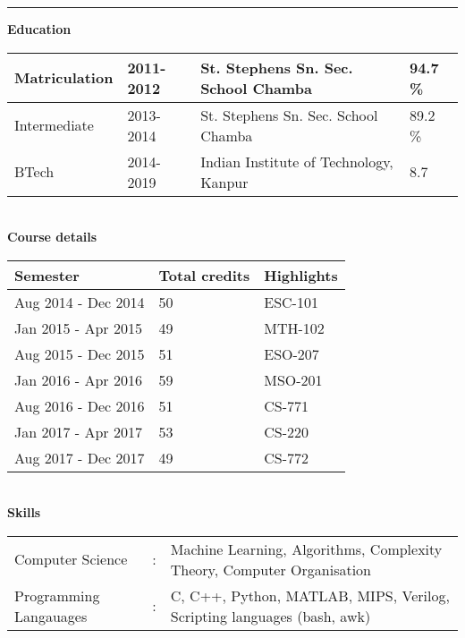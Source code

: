\documentclass[a4paper, 10pt]{article}
\begin{document}
\noindent\rule{\textwidth}{0.1pt}
\newline \newline
\hspace*{1.5ex}\textbf{Education}
\begin{table}[!h]
\renewcommand{\arraystretch}{1.2}
\begin{tabular}{|l|l|l|l|}
\hline
Matriculation & 2011-2012 & St. Stephens Sn. Sec. School Chamba  &  94.7 \% \\
\hline
Intermediate  & 2013-2014 & St. Stephens Sn. Sec. School Chamba  &  89.2 \%\\
\hline
BTech		  & 2014-2019 &	Indian Institute of Technology, Kanpur		&  8.7	\\
\hline
\end{tabular}
\end{table}\\
\hspace*{1.5ex}\textbf{Course details}
\begin{table}[!h]
\renewcommand{\arraystretch}{1.1}
\begin{tabular}{|l|l|l|}
\hline
\textbf{Semester} & \textbf{Total credits} & \textbf{Highlights} \\
\hline
Aug 2014 - Dec 2014  & 50 &	ESC-101 \\
\hline
Jan 2015 - Apr 2015  & 49 &	MTH-102 \\
\hline
Aug 2015 - Dec 2015  & 51 &	ESO-207 \\
\hline
Jan 2016 - Apr 2016  & 59 &	MSO-201 \\
\hline
Aug 2016 - Dec 2016  & 51 &	CS-771 \\
\hline
Jan 2017 - Apr 2017  & 53 &	CS-220 \\
\hline
Aug 2017 - Dec 2017  & 49 &	CS-772 \\
\hline
\end{tabular}
\end{table} \\
\hspace*{1.5ex}\textbf{Skills}
\begin{table}[!h]
\begin{tabular}{lll}
Computer Science  & : & Machine Learning, Algorithms, Complexity Theory, Computer Organisation \\
Programming Langauages  & : & C, C++, Python, MATLAB, MIPS, Verilog, Scripting languages (bash, awk) \\
\end{tabular}
\end{table} \\
\end{document}
